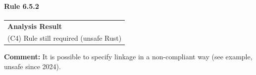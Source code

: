 \paragraph{Rule 6.5.2}
\begin{longtable}{p{13cm}}
\textbf{Analysis Result} \\
(C4) Rule still required (unsafe Rust) \\
\end{longtable}
\textbf{Comment:} It is possible to specify linkage in a non-compliant way (see example, unsafe since 2024). \\


